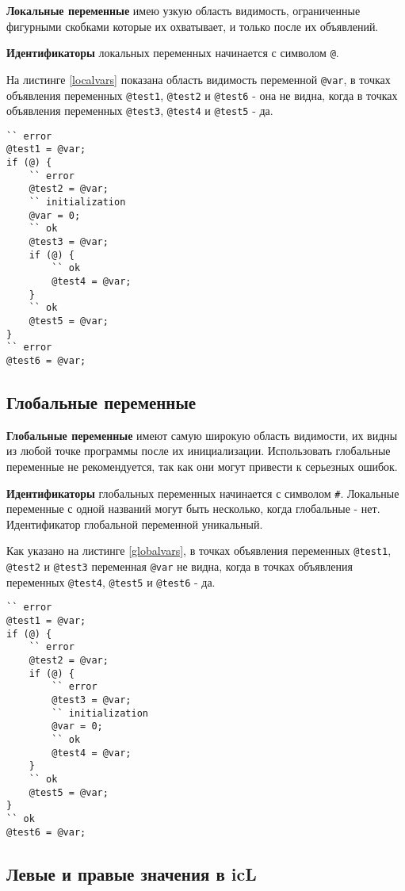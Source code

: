 \documentclass[a4paper, 14pt]{extarticle}
\begin{document}
	\textbf{Локальные переменные} имею узкую область видимость, ограниченные фигурными скобками которые их охватывает, и только после их объявлений. 
	
	{\bf Идентификаторы} локальных переменных начинается с символом \lstinline`@`. 
	
	На листинге \ref{localvars} показана область видимость переменной \lstinline`@var`, в точках объявления переменных \lstinline`@test1`, \lstinline`@test2` и \lstinline`@test6` - она не видна, когда в точках объявления переменных \lstinline`@test3`, \lstinline`@test4` и \lstinline`@test5` - да.
\begin{lstlisting}[caption=Область видимости локальных перемен, label=localvars]
`` error
@test1 = @var;
if (@) {
	`` error
	@test2 = @var; 
	`` initialization
	@var = 0;
	`` ok
	@test3 = @var;
	if (@) {
		`` ok
		@test4 = @var;
	}
	`` ok
	@test5 = @var; 
}
`` error
@test6 = @var; 
\end{lstlisting}

\subsection{Глобальные переменные}

	\textbf{Глобальные переменные} имеют самую широкую область видимости, их видны из любой точке программы после их инициализации. Использовать глобальные переменные не рекомендуется, так как они могут привести к серьезных ошибок. 
	
	{\bf Идентификаторы} глобальных переменных начинается с символом {\color{blue2}\lstinline`#`}. Локальные переменные с одной названий могут быть несколько, когда глобальные - нет. Идентификатор глобальной переменной уникальный.
	
	Как указано на листинге \ref{globalvars}, в точках объявления переменных \lstinline`@test1`, \lstinline`@test2` и \lstinline`@test3` переменная \lstinline`@var` не видна, когда в точках объявления переменных \lstinline`@test4`, \lstinline`@test5` и \lstinline`@test6` - да.
	
\begin{lstlisting}[caption=Область видимости глобальных перемен, label=globalvars]
`` error
@test1 = @var;
if (@) {
	`` error
	@test2 = @var; 
	if (@) {
		`` error
		@test3 = @var;
		`` initialization
		@var = 0;
		`` ok
		@test4 = @var;
	}
	`` ok
	@test5 = @var; 
}
`` ok
@test6 = @var;
\end{lstlisting}

\subsection{Левые и правые значения в icL}
\end{document}
